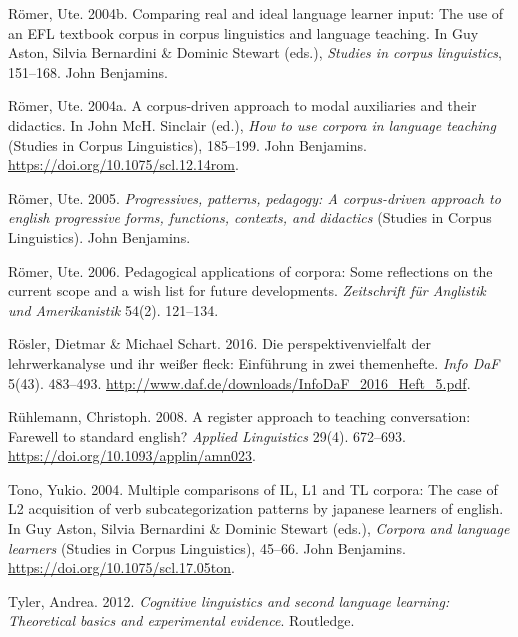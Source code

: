 \documentclass[
  letterpaper,
  DIV=11,
  numbers=noendperiod]{scrreprt}
\newlength{\cslhangindent}
\newenvironment{CSLReferences}[2] %
 {\begin{list}{}{%
  \setlength{\itemindent}{0pt}
  \setlength{\leftmargin}{0pt}
  \setlength{\parsep}{0pt}
  \ifodd #1
   \setlength{\leftmargin}{\cslhangindent}
   \setlength{\itemindent}{-1\cslhangindent}
  \fi
  \setlength{\itemsep}{#2\baselineskip}}}
 {\end{list}}
\begin{document}
\begin{CSLReferences}{1}{0}
Römer, Ute. 2004b. Comparing real and ideal language learner input: The
use of an EFL textbook corpus in corpus linguistics and language
teaching. In Guy Aston, Silvia Bernardini \& Dominic Stewart (eds.),
\emph{Studies in corpus linguistics}, 151--168. John Benjamins.

Römer, Ute. 2004a. A corpus-driven approach to modal auxiliaries and
their didactics. In John McH. Sinclair (ed.), \emph{How to use corpora
in language teaching} (Studies in Corpus Linguistics), 185--199. John
Benjamins. \url{https://doi.org/10.1075/scl.12.14rom}.

Römer, Ute. 2005. \emph{Progressives, patterns, pedagogy: A
corpus-driven approach to english progressive forms, functions,
contexts, and didactics} (Studies in Corpus Linguistics). John
Benjamins.

Römer, Ute. 2006. Pedagogical applications of corpora: Some reflections
on the current scope and a wish list for future developments.
\emph{Zeitschrift für Anglistik und Amerikanistik} 54(2). 121--134.

Rösler, Dietmar \& Michael Schart. 2016. Die perspektivenvielfalt der
lehrwerkanalyse und ihr weißer fleck: Einführung in zwei themenhefte.
\emph{Info DaF} 5(43). 483--493.
\url{http://www.daf.de/downloads/InfoDaF_2016_Heft_5.pdf}.

Rühlemann, Christoph. 2008. A register approach to teaching
conversation: Farewell to standard english? \emph{Applied Linguistics}
29(4). 672--693. \url{https://doi.org/10.1093/applin/amn023}.

Tono, Yukio. 2004. Multiple comparisons of IL, L1 and TL corpora: The
case of L2 acquisition of verb subcategorization patterns by japanese
learners of english. In Guy Aston, Silvia Bernardini \& Dominic Stewart
(eds.), \emph{Corpora and language learners} (Studies in Corpus
Linguistics), 45--66. John Benjamins.
\url{https://doi.org/10.1075/scl.17.05ton}.

Tyler, Andrea. 2012. \emph{Cognitive linguistics and second language
learning: Theoretical basics and experimental evidence}. Routledge.


\end{CSLReferences}
\end{document}
